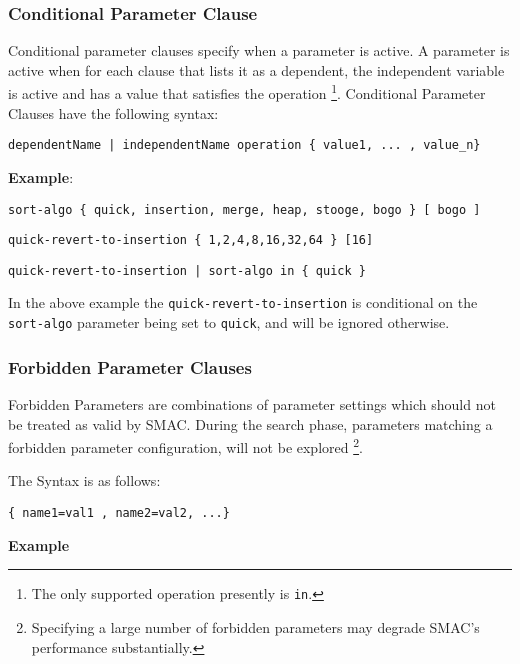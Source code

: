 \documentclass[manual.tex]{subfiles}
\begin{document}
\subsubsection{Conditional Parameter Clause}

Conditional parameter clauses specify when a parameter is active. A parameter
is active when for each clause that lists it as a dependent, the independent variable is active and has a value that satisfies the operation \footnote{The only supported operation presently is \texttt{in}.}. Conditional Parameter Clauses have the following syntax:


\texttt{dependentName~|~independentName~operation~\{~value1,~...~,~value\_n\}}

\vspace{2pt}
\textbf{Example}:
\vspace{5pt}

\texttt{sort-algo~\{~quick,~insertion,~merge,~heap,~stooge,~bogo~\}~{[}~bogo~{]}}

\texttt{quick-revert-to-insertion~\{~1,2,4,8,16,32,64~\}~{[}16{]}}

\texttt{quick-revert-to-insertion~|~sort-algo~in~\{~quick~\}}
\vspace{2pt}

In the above example the \texttt{quick-revert-to-insertion} is conditional on the \texttt{sort-algo} parameter being set to \texttt{quick}, and will be ignored otherwise.


\subsubsection{Forbidden Parameter Clauses}

Forbidden Parameters are combinations of parameter settings which should not be treated
as valid by SMAC. During the search phase, parameters matching a forbidden
parameter configuration, will not be explored \footnote{Specifying a large number of forbidden parameters may degrade SMAC's performance substantially.}. 

The Syntax is as follows:

\texttt{\{~name1=val1~,~name2=val2,~...\}}

\vspace{2pt}
\textbf{Example}
\vspace{5pt}
\end{document}

